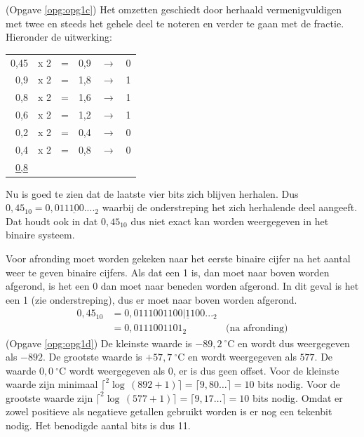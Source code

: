 \documentclass[a4paper,12pt,addpoints,fleqn,dutch,concept]{tisdexam}
\begin{document}
\begin{questions}
(Opgave \ref{opg:opg1c}) Het omzetten geschiedt door herhaald vermenigvuldigen
met twee en steeds het gehele deel te noteren en verder te gaan met de fractie.
Hieronder de uitwerking:

\begin{table}[H]
  \begin{tabular}{ r c c r c c }
  0,45 & x 2 & = & 0,9 & $\rightarrow$ & 0 \\
   0,9 & x 2 & = & 1,8 & $\rightarrow$ & 1 \\
   0,8 & x 2 & = & 1,6 & $\rightarrow$ & 1 \\
   0,6 & x 2 & = & 1,2 & $\rightarrow$ & 1 \\
   0,2 & x 2 & = & 0,4 & $\rightarrow$ & 0 \\
   0,4 & x 2 & = & 0,8 & $\rightarrow$ & 0 \\
   \underline{0,8} &     &   &     &               &
  \end{tabular}
\end{table}

Nu is goed te zien dat de laatste vier bits zich blijven herhalen. Dus
$0,45_{10} = 0,01\underline{1100}...._{2}$ waarbij de onderstreping het
zich herhalende deel aangeeft. Dat houdt ook in dat $0,45_{10}$ dus niet
exact kan worden weergegeven in het binaire systeem.

Voor afronding moet worden gekeken naar het eerste binaire cijfer na het
aantal weer te geven binaire cijfers. Als dat een 1 is, dan moet naar
boven worden afgerond, is het een 0 dan moet naar beneden worden afgerond.
In dit geval is het een 1 (zie onderstreping), dus er moet naar boven worden
afgerond.
\begin{equation*}
\begin{split}
0,45_{10} &= 0,0111001100|\underline{1}100..._{2} \\
          &= 0,0111001101_{2} \qquad \qquad \text{(na afronding)}
\end{split}
\end{equation*}
(Opgave \ref{opg:opg1d}) De kleinste waarde is $-89,2\ ^{\circ}$C en wordt
dus weergegeven als $-892$. De grootste waarde is $+57,7\ ^{\circ}$C en wordt
weergegeven als $577$. De waarde $0,0\ ^{\circ}$C wordt weergegeven als $0$,
er is dus geen offset. Voor de kleinste waarde zijn minimaal
$\lceil ^{2}\log\,(892+1) \rceil = \lceil 9,80\ldots \rceil = 10$ bits nodig.
Voor de grootste waarde zijn $\lceil ^{2}\log\,(577+1) \rceil = \lceil 
9,17\ldots \rceil = 10$ bits nodig. Omdat er zowel positieve als negatieve
getallen gebruikt worden is er nog een tekenbit nodig. Het benodigde aantal
bits is dus 11.



\end{questions}
\end{document}
